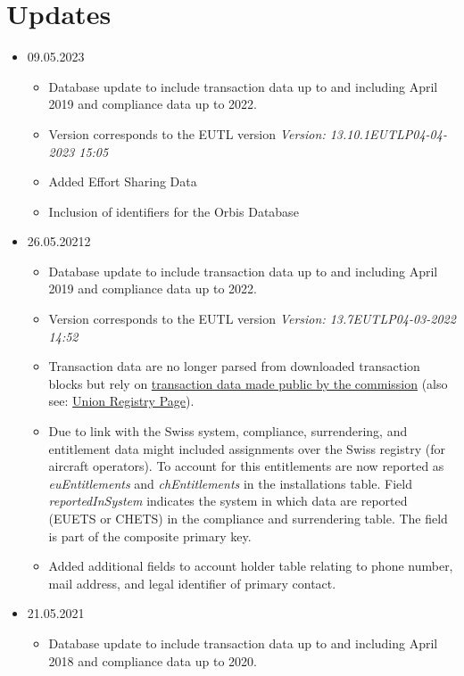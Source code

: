 \documentclass[authoryear]{elsarticle}
\begin{document}
\section*{Updates}
\begin{itemize}
	\item 09.05.2023
	\begin{itemize}
		\item Database update to include transaction data up to and including April 2019 and compliance data up to 2022. 
		\item Version corresponds to the EUTL version \emph{Version: 13.10.1EUTLP04-04-2023 15:05}
		\item Added Effort Sharing Data
		\item Inclusion of identifiers for the Orbis Database
	\end{itemize}		
	\item 26.05.20212
	\begin{itemize}
		\item Database update to include transaction data up to and including April 2019 and compliance data up to 2022. 
		\item Version corresponds to the EUTL version \emph{Version: 13.7EUTLP04-03-2022 14:52}
		\item Transaction data are no longer parsed from downloaded transaction blocks but rely on  \href{https://ec.europa.eu/clima/document/download/0cda99f1-16f6-41e7-b190-887cd71339a4_en?filename=transactions_eutl_2022.zip}{transaction data made public by the commission} (also see: \href{https://ec.europa.eu/clima/eu-action/eu-emissions-trading-system-eu-ets/union-registry_en#tab-0-1}{Union Registry Page}).
		\item Due to link with the Swiss system, compliance, surrendering, and entitlement data might included assignments over the Swiss registry (for aircraft operators). To account for this entitlements are now reported as \emph{euEntitlements} and \emph{chEntitlements} in the installations table. Field \emph{reportedInSystem} indicates the system in which data are reported (EUETS or CHETS) in the compliance and surrendering table. The field is part of the composite primary key. 
		\item Added additional fields to account holder table relating to phone number, mail address, and legal identifier of primary contact.
	\end{itemize}	
	\item 21.05.2021
		\begin{itemize}
			\item Database update to include transaction data up to and including April 2018 and compliance data up to 2020. 

\end{itemize}
\end{itemize}
\end{document}
